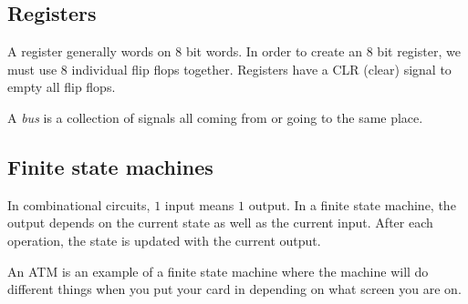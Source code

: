 \subsection{Registers}\label{sub:registers}

A register generally words on \(8\) bit words.
In order to create an \(8\) bit register, we must use \(8\) individual flip flops together.
Registers have a CLR (clear) signal to empty all flip flops.

A \emph{bus} is a collection of signals all coming from or going to the same place.

\subsection{Finite state machines}\label{sub:finite_state_machines}

In combinational circuits, \(1\) input means \(1\) output.
In a finite state machine, the output depends on the current state as well as the current input.
After each operation, the state is updated with the current output.

An ATM is an example of a finite state machine where the machine will do different things when you put your card in depending on what screen you are on.
